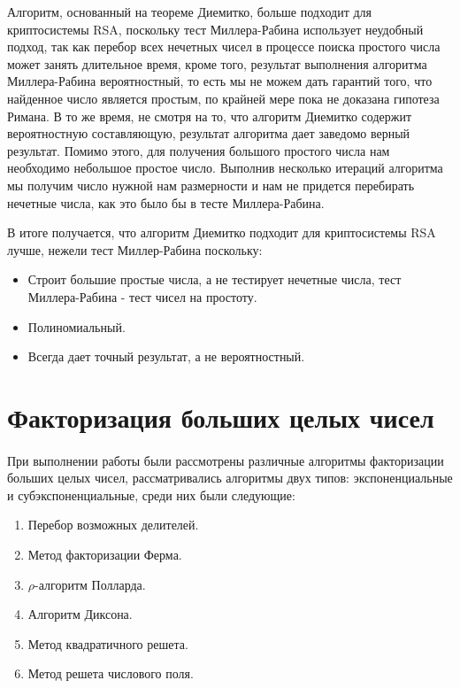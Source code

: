 	Алгоритм, основанный на теореме Диемитко, больше подходит для криптосистемы RSA, поскольку тест Миллера-Рабина использует неудобный подход, так как 
	перебор всех нечетных чисел в процессе поиска простого числа может занять длительное время, кроме того, результат выполнения алгоритма Миллера-Рабина вероятностный, то есть мы не можем дать гарантий того, что найденное число является простым, по крайней мере пока не доказана гипотеза Римана. В то же время, не смотря на то, что алгоритм Диемитко содержит вероятностную составляющую, результат алгоритма дает заведомо верный результат. Помимо этого, для получения большого простого числа нам необходимо небольшое простое число. Выполнив несколько итераций алгоритма мы получим число нужной нам размерности и нам не придется перебирать нечетные числа, как это было бы в тесте Миллера-Рабина.

	В итоге получается, что алгоритм Диемитко подходит для криптосистемы RSA лучше, нежели тест Миллер-Рабина поскольку:
		\begin{itemize}
			\item Строит большие простые числа, а не тестирует нечетные числа, тест Миллера-Рабина - тест чисел на простоту.
			\item Полиномиальный.
			\item Всегда дает точный результат, а не вероятностный.
		\end{itemize}

\section*{Факторизация больших целых чисел}

	\paragraph{} При выполнении работы были рассмотрены различные алгоритмы факторизации больших целых чисел, рассматривались алгоритмы двух типов: 
	экспоненциальные и субэкспоненциальные, среди них были следующие:
		\begin{enumerate}
			\item Перебор возможных делителей.
			\item Метод факторизации Ферма.
			\item {$\rho$}-алгоритм Полларда.
			\item Алгоритм Диксона.
			\item Метод квадратичного решета.
			\item Метод решета числового поля.
		\end{enumerate}

